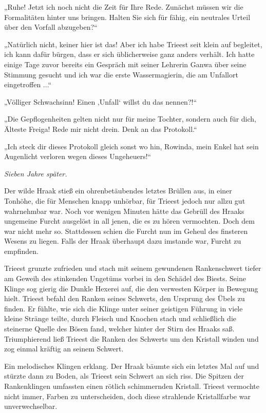 „Ruhe! Jetzt ich noch nicht die Zeit für Ihre Rede. Zunächst müssen wir die Formalitäten hinter uns bringen. Halten Sie sich für fähig, ein neutrales Urteil über den Vorfall abzugeben?“

„Natürlich nicht, keiner hier ist das! Aber ich habe Trieest seit klein auf begleitet, ich kann dafür bürgen, dass er sich üblicherweise ganz anders verhält. Ich hatte einige Tage zuvor bereits ein Gespräch mit seiner Lehrerin Ganwa über seine Stimmung gesucht und ich war die erste Wassermagierin, die am Unfallort eingetroffen ...“

„Völliger Schwachsinn! Einen ‚Unfall‘ willst du das nennen?!“

„Die Gepflogenheiten gelten nicht nur für meine Tochter, sondern auch für dich, Älteste Freiga! Rede mir nicht drein. Denk an das Protokoll.“

„Ich steck dir dieses Protokoll gleich sonst wo hin, Rowinda, mein Enkel hat sein Augenlicht verloren wegen dieses Ungeheuers!“








\textit{Sieben Jahre später.}\bigskip



Der wilde Hraak stieß ein ohrenbetäubendes letztes Brüllen aus, in einer Tonhöhe, die für Menschen knapp unhörbar, für Trieest jedoch nur allzu gut wahrnehmbar war. Noch vor wenigen Minuten hätte das Gebrüll des Hraaks ungemeine Furcht ausgelöst in all jenen, die es zu hören vermochten. Doch dem war nicht mehr so. Stattdessen schien die Furcht nun im Geheul des finsteren Wesens zu liegen. Falls der Hraak überhaupt dazu imstande war, Furcht zu empfinden.

Trieest grunzte zufrieden und stach mit seinem gewundenen Rankenschwert tiefer am Geweih des stinkenden Ungetüms vorbei in den Schädel des Biests. Seine Klinge sog gierig die Dunkle Hexerei auf, die den verwesten Körper in Bewegung hielt. Trieest befahl den Ranken seines Schwerts, den Ursprung des Übels zu finden. Er fühlte, wie sich die Klinge unter seiner geistigen Führung in viele kleine Stränge teilte, durch Fleisch und Knochen stach und schließlich die steinerne Quelle des Bösen fand, welcher hinter der Stirn des Hraaks saß. Triumphierend ließ Trieest die Ranken des Schwerts um den Kristall winden und zog einmal kräftig an seinem Schwert.

Ein melodisches Klingen erklang. Der Hraak bäumte sich ein letztes Mal auf und stürzte dann zu Boden, als Trieest sein Schwert an sich riss. Die Spitzen der Rankenklingen umfassten einen rötlich schimmernden Kristall. Trieest vermochte nicht immer, Farben zu unterscheiden, doch diese strahlende Kristallfarbe war unverwechselbar.

